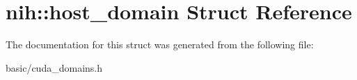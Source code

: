\hypertarget{structnih_1_1host__domain}{
\section{nih\-:\-:host\-\_\-domain \-Struct \-Reference}
\label{structnih_1_1host__domain}
}


\-The documentation for this struct was generated from the following file\-:\begin{DoxyCompactItemize}
\item 
basic/cuda\-\_\-domains.\-h\end{DoxyCompactItemize}
